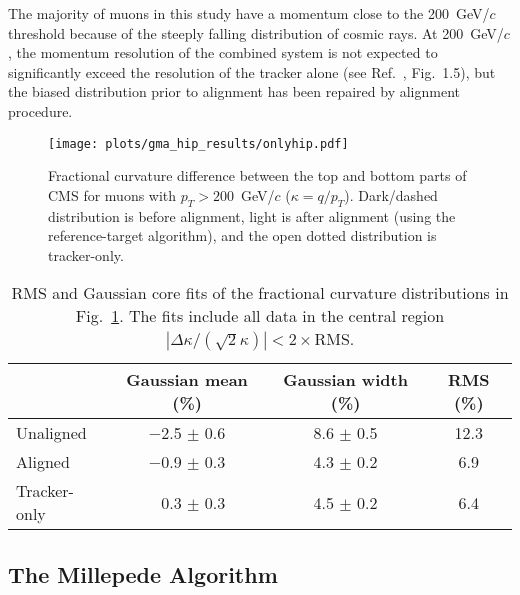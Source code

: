\documentclass[11pt,twoside,a4paper,cmspaper]{cms-tdr}
\begin{document}
The majority of muons in this study
have a momentum close to the 200~GeV/$c$ threshold because of the
steeply falling distribution of cosmic rays.  At 200~GeV/$c$, the
momentum resolution of the combined system is not expected to
significantly exceed the resolution of the tracker alone (see
Ref.~\cite{Ball:2007zza}, Fig.~1.5), but the biased distribution prior
to alignment has been repaired by alignment procedure.

\begin{figure}[p]
  \centering
  \texttt{[image: plots/gma\_hip\_results/onlyhip.pdf]}
  \caption{Fractional curvature difference between the top and bottom
  parts of CMS for muons with $p_T > 200$~GeV/$c$ ($\kappa = q/p_T$).
  Dark/dashed distribution is before alignment, light is after
  alignment (using the reference-target algorithm), and the open
  dotted distribution is tracker-only. \label{fig:chargesplitting}}
\end{figure}

\begin{table}[p]
\caption{RMS and Gaussian core fits of the fractional curvature
  distributions in Fig.~\ref{fig:chargesplitting}.  The fits include
  all data in the central region
  $\left|\Delta \kappa/(\sqrt{2}\kappa)\right| <
  2\times$RMS. \label{tab:chargesplitting}}

\begin{center}
\renewcommand{\arraystretch}{1.5}
\begin{tabular}{l c c c}
\hline\hline & \hspace{0.25 cm}Gaussian mean (\%)\hspace{0.25 cm} & \hspace{0.25 cm}Gaussian width (\%)\hspace{0.25 cm} & \hspace{0.25 cm}RMS (\%)\hspace{0.25 cm} \\\hline
Unaligned & $-$2.5 $\pm$ 0.6 & 8.6 $\pm$ 0.5 & 12.3 \\
Aligned & $-$0.9 $\pm$ 0.3 & 4.3 $\pm$ 0.2 & 6.9 \\\hline
Tracker-only & \textcolor{white}{$-$}0.3 $\pm$ 0.3 & 4.5 $\pm$ 0.2 & 6.4 \\\hline\hline
\end{tabular}
\end{center}
\end{table}

\subsection{The Millepede Algorithm}
\label{sec:mpalgo}
\end{document}
